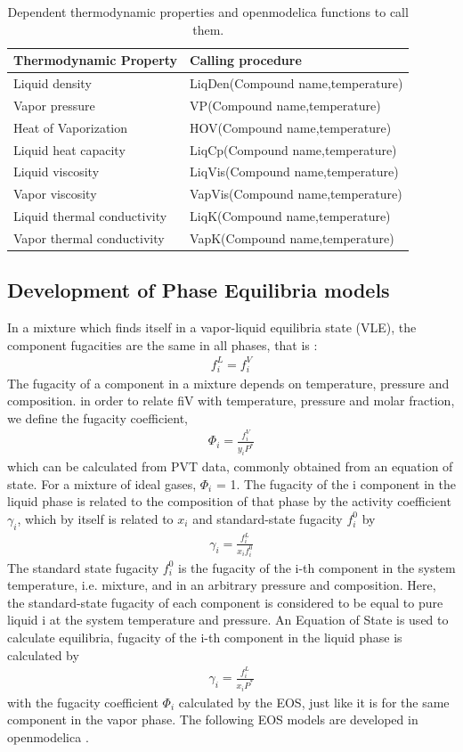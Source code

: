 \documentclass[12pt]{report}
\begin{document}
\begin{table}
\centering
\caption {Dependent thermodynamic properties and openmodelica functions to call them.}
\label{tab:depprop}
\vspace{1ex}
\begin{tabular}{l|l} \hline
Thermodynamic Property & Calling procedure \\ \hline
Liquid density & LiqDen(Compound name,temperature) \\
Vapor pressure & VP(Compound name,temperature) \\
Heat of Vaporization & HOV(Compound name,temperature) \\
Liquid heat capacity & LiqCp(Compound name,temperature) \\
Liquid viscosity & LiqVis(Compound name,temperature) \\
Vapor viscosity & VapVis(Compound name,temperature) \\
Liquid thermal conductivity & LiqK(Compound name,temperature) \\
Vapor thermal conductivity & VapK(Compound name,temperature) \\ \hline
\end{tabular}
\end{table}

\subsection{Development of Phase Equilibria models}
In a mixture which finds itself in a vapor-liquid equilibria state (VLE), the component fugacities are the same in all phases, that is :
\begin{align*}
f_i^L = f_i^V 
\end{align*}
The fugacity of a component in a mixture depends on temperature, pressure and composition. in order to relate fiV with temperature, pressure and molar fraction, we define the fugacity coefficient,
\begin{align*}
\Phi_i = \frac{f_i^V}{y_iP^*}
\end{align*}
which can be calculated from PVT data, commonly obtained from an equation of state. For a mixture of ideal gases, $\Phi_i$ = 1.
The fugacity of the i component in the liquid phase is related to the composition of that phase by the activity coefficient $\gamma_i$, which by itself is related to $x_i$ and standard-state fugacity $f_i^0$ by
\begin{align*}
\gamma_i = \frac{f_i^L}{x_if_i^0}
\end{align*}
The standard state fugacity $f_i^0$ is the fugacity of the i-th component in the system temperature, i.e. mixture, and in an arbitrary pressure and composition. Here, the standard-state fugacity of each component is considered to be equal to pure liquid i at the system temperature and pressure. An Equation of State is used to calculate equilibria, fugacity of the i-th component in the liquid phase is calculated by
\begin{align*}
\gamma_i = \frac{f_i^L}{x_iP^*}
\end{align*}
with the fugacity coefficient $\Phi_i$ calculated by the EOS, just like it is for the same component in the vapor phase.
The following EOS models are developed in openmodelica \cite{DWSIM}.
\end{document}
